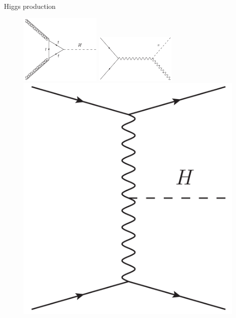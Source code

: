 \begin{frame}{Higgs production}
\vspace{-.2cm}
\begin{figure}[!Hhtbp]
  \begin{center}
    \includegraphics[width=0.35\textwidth, height=3.cm]{../figs/GluonFusion_H.png}
    \includegraphics[width=0.35\textwidth, height=3.cm]{../figs/Higgstrahlung.png}\\
    \includegraphics[scale=0.3]{../figs/VBF_H.png}

\end{center}
\end{figure}
\end{frame}
